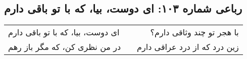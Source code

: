 \begin{center}
\section*{رباعی شماره ۱۰۳: ای دوست، بیا، که با تو باقی دارم}
\label{sec:103}
\begin{longtable}{l p{0.5cm} r}
ای دوست، بیا، که با تو باقی دارم
&&
با هجر تو چند وثاقی دارم؟
\\
در من نظری کن، که مگر باز رهم
&&
زین درد که از درد عراقی دارم
\\
\end{longtable}
\end{center}
